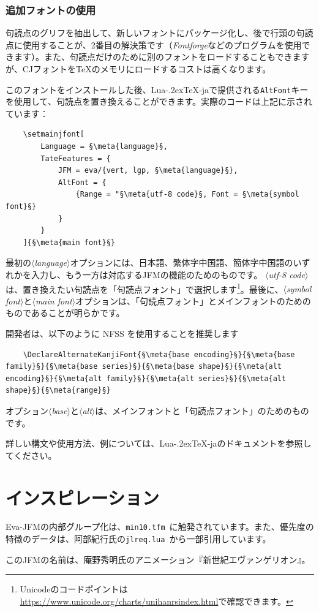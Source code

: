 \documentclass[twoside]{ltjsarticle}
\def\meta#1{{\normalfont\rmfamily\itshape$\langle$#1\/$\rangle$}}
\def\段{\par}
\def\LuaTeX{Lua\kern-.2ex\TeX}
\begin{document}
\subsubsection{追加フォントの使用}
句読点のグリフを抽出して、新しいフォントにパッケージ化し、後で行頭の句読点に使用することが、2番目の解決策です（\textit{Fontforge\/}などのプログラムを使用できます）。また、句読点だけのために別のフォントをロードすることもできますが、CJフォントを{\TeX}のメモリにロードするコストは高くなります。\段
このフォントをインストールした後、\LuaTeX-jaで提供される\texttt{AltFont}キーを使用して、句読点を置き換えることができます。実際のコードは上記に示されています：
\begin{lstlisting}
    \setmainjfont[
        Language = §\meta{language}§,
        TateFeatures = {
            JFM = eva/{vert, lgp, §\meta{language}§},
            AltFont = {
                {Range = "§\meta{utf-8 code}§, Font = §\meta{symbol font}§}
            }
        }
    ]{§\meta{main font}§}
\end{lstlisting}
最初の\meta{language}オプションには、日本語、繁体字中国語、簡体字中国語のいずれかを入力し、もう一方は対応するJFMの機能のためのものです。 \meta{utf-8 code}は、置き換えたい句読点を「句読点フォント」で選択します\footnote{Unicodeのコードポイントは\url{https://www.unicode.org/charts/unihanrsindex.html}で確認できます。}。最後に、\meta{symbol font}と\meta{main font}オプションは、「句読点フォント」とメインフォントのためのものであることが明らかです。\段
開発者は、以下のように NFSS を使用することを推奨します
\begin{lstlisting}
    \DeclareAlternateKanjiFont{§\meta{base encoding}§}{§\meta{base family}§}{§\meta{base series}§}{§\meta{base shape}§}{§\meta{alt encoding}§}{§\meta{alt family}§}{§\meta{alt series}§}{§\meta{alt shape}§}{§\meta{range}§}
\end{lstlisting}
オプション\meta{base}と\meta{alt}は、メインフォントと「句読点フォント」のためのものです。\段
詳しい構文や使用方法、例については、\LuaTeX-jaのドキュメント\cite{luatexja-doc}を参照してください。

\section{インスピレーション}
\textsf{Eva-JFM}の内部グループ化は、\texttt{min10.tfm}~\cite{min10}に触発されています。また、優先度の特徴のデータは、阿部紀行氏の\texttt{jlreq.lua}~\cite{ltxjlreq}から一部引用しています。\段
このJFMの名前は、庵野秀明氏のアニメーション『新世紀エヴァンゲリオン』。
\end{document}
